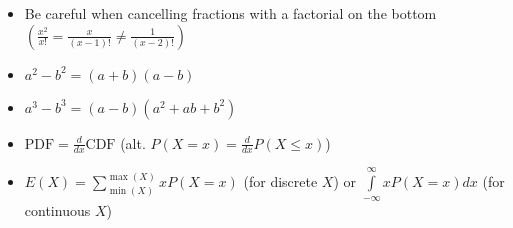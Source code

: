 \documentclass[../main.tex]{subfile}
\begin{document}

\begin{itemize}
	\item Be careful when cancelling fractions with a factorial on the bottom $\displaystyle \left(\frac{x^2}{x!} = \frac{x}{(x - 1)!} \ne \frac{1}{(x - 2)!}\right)$
	\item $a^2 - b^2 = (a + b)(a - b)$
	\item $a^3 - b^3 = (a - b)(a^2 + ab + b^2)$
\end{itemize}


\begin{itemize}
	\item $\text{PDF} = \frac{d}{dx} \text{CDF}$ (alt. $P(X = x) = \frac{d}{dx} P(X \le x)$)
	\item $E(X) = \sum\limits_{\min(X)}^{\max(X)} x P(X = x)$ (for discrete $X$) or $\int\limits_{-\infty}^{\infty} x P(X = x) dx$ (for continuous $X$)
\end{itemize}
\end{document}
